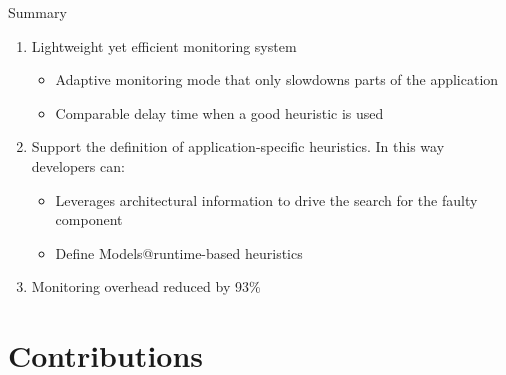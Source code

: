\documentclass[10pt,xcolor={dvipsnames}]{beamer}
\begin{document}
	\begin{frame}{Summary}
		\begin{enumerate}\setlength{\itemsep}{0.7cm}
			\item Lightweight yet efficient monitoring system
				\begin{itemize}
					\item Adaptive monitoring mode that only slowdowns parts of the application
					\item Comparable delay time when a good heuristic is used
				\end{itemize}
			\item Support the definition of application-specific heuristics. In this way developers can:
				\begin{itemize}
					\item Leverages architectural information to drive the search for the
					faulty component
					\item Define Models@runtime-based heuristics
				\end{itemize}
			
			\item Monitoring overhead reduced by 93\%
			
		\end{enumerate}
	\end{frame}
	
	\section{Contributions}
	
\end{document}
